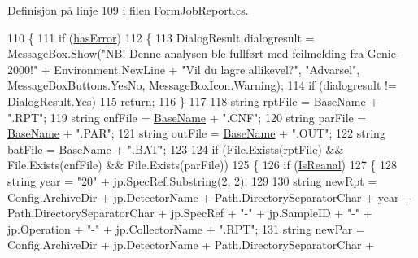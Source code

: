 Definisjon på linje 109 i filen Form\+Job\+Report.\+cs.


\begin{DoxyCode}
110         \{
111             \textcolor{keywordflow}{if} (\hyperlink{class_scintilab_1_1_form_job_report_aa9d718d9966b2d6263142d811c4690ef}{hasError})
112             \{
113                 DialogResult dialogresult = MessageBox.Show(\textcolor{stringliteral}{"NB! Denne analysen ble fullført med
       feilmelding fra Genie-2000!"} + Environment.NewLine + \textcolor{stringliteral}{"Vil du lagre allikevel?"}, \textcolor{stringliteral}{"Advarsel"}, MessageBoxButtons.YesNo, 
      MessageBoxIcon.Warning);
114                 \textcolor{keywordflow}{if} (dialogresult != DialogResult.Yes)
115                     \textcolor{keywordflow}{return};
116             \}
117 
118             \textcolor{keywordtype}{string} rptFile = \hyperlink{class_scintilab_1_1_form_job_report_ae2edaad73f9347d9cbc70299ea55c8e4}{BaseName} + \textcolor{stringliteral}{".RPT"};
119             \textcolor{keywordtype}{string} cnfFile = \hyperlink{class_scintilab_1_1_form_job_report_ae2edaad73f9347d9cbc70299ea55c8e4}{BaseName} + \textcolor{stringliteral}{".CNF"};
120             \textcolor{keywordtype}{string} parFile = \hyperlink{class_scintilab_1_1_form_job_report_ae2edaad73f9347d9cbc70299ea55c8e4}{BaseName} + \textcolor{stringliteral}{".PAR"};
121             \textcolor{keywordtype}{string} outFile = \hyperlink{class_scintilab_1_1_form_job_report_ae2edaad73f9347d9cbc70299ea55c8e4}{BaseName} + \textcolor{stringliteral}{".OUT"};
122             \textcolor{keywordtype}{string} batFile = \hyperlink{class_scintilab_1_1_form_job_report_ae2edaad73f9347d9cbc70299ea55c8e4}{BaseName} + \textcolor{stringliteral}{".BAT"};
123 
124             \textcolor{keywordflow}{if} (File.Exists(rptFile) && File.Exists(cnfFile) && File.Exists(parFile))
125             \{
126                 \textcolor{keywordflow}{if} (\hyperlink{class_scintilab_1_1_form_job_report_ad6eadf59048ecf2909b4e6c0fd48751f}{IsReanal})
127                 \{
128                     \textcolor{keywordtype}{string} year = \textcolor{stringliteral}{"20"} + jp.SpecRef.Substring(2, 2);
129 
130                     \textcolor{keywordtype}{string} newRpt = Config.ArchiveDir + jp.DetectorName + Path.DirectorySeparatorChar + 
      year + Path.DirectorySeparatorChar + jp.SpecRef + \textcolor{stringliteral}{"-"} + jp.SampleID + \textcolor{stringliteral}{"-"} + jp.Operation + \textcolor{stringliteral}{"-"} + 
      jp.CollectorName + \textcolor{stringliteral}{".RPT"};
131                     \textcolor{keywordtype}{string} newPar = Config.ArchiveDir + jp.DetectorName + Path.DirectorySeparatorChar + 

\end{DoxyCode}
